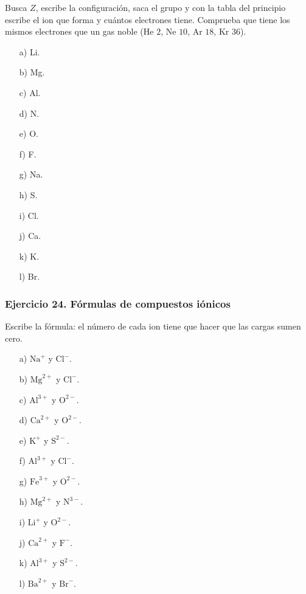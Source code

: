 Busca $Z$, escribe la configuración, saca el grupo
y con la tabla del principio escribe el ion que forma
y cuántos electrones tiene.
Comprueba que tiene los mismos electrones que un gas noble
(He $2$, Ne $10$, Ar $18$, Kr $36$).

\begin{enumerate}
    \item[a)] Li.
    \item[b)] Mg.
    \item[c)] Al.
    \item[d)] N.
    \item[e)] O.
    \item[f)] F.
    \item[g)] Na.
    \item[h)] S.
    \item[i)] Cl.
    \item[j)] Ca.
    \item[k)] K.
    \item[l)] Br.
\end{enumerate}

\subsubsection*{Ejercicio 24. Fórmulas de compuestos iónicos}

Escribe la fórmula:
el número de cada ion tiene que hacer que las cargas sumen cero.

\begin{enumerate}
    \item[a)] $\mathrm{Na}^{+}$ y $\mathrm{Cl}^{-}$.
    \item[b)] $\mathrm{Mg}^{2+}$ y $\mathrm{Cl}^{-}$.
    \item[c)] $\mathrm{Al}^{3+}$ y $\mathrm{O}^{2-}$.
    \item[d)] $\mathrm{Ca}^{2+}$ y $\mathrm{O}^{2-}$.
    \item[e)] $\mathrm{K}^{+}$ y $\mathrm{S}^{2-}$.
    \item[f)] $\mathrm{Al}^{3+}$ y $\mathrm{Cl}^{-}$.
    \item[g)] $\mathrm{Fe}^{3+}$ y $\mathrm{O}^{2-}$.
    \item[h)] $\mathrm{Mg}^{2+}$ y $\mathrm{N}^{3-}$.
    \item[i)] $\mathrm{Li}^{+}$ y $\mathrm{O}^{2-}$.
    \item[j)] $\mathrm{Ca}^{2+}$ y $\mathrm{F}^{-}$.
    \item[k)] $\mathrm{Al}^{3+}$ y $\mathrm{S}^{2-}$.
    \item[l)] $\mathrm{Ba}^{2+}$ y $\mathrm{Br}^{-}$.
\end{enumerate}

